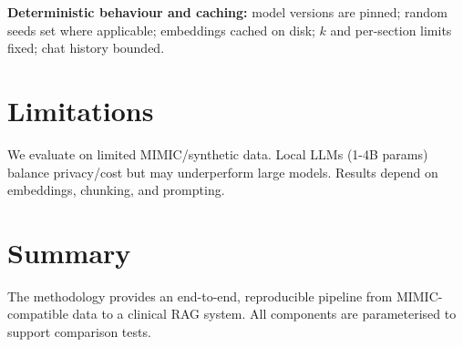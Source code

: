 \noindent \textbf{Deterministic behaviour and caching:} model versions are pinned; random seeds set where applicable; embeddings cached on disk; \(k\) and per-section limits fixed; chat history bounded.

\section{Limitations}
We evaluate on limited MIMIC/synthetic data. Local LLMs (1-4B params) balance privacy/cost but may underperform large models. Results depend on embeddings, chunking, and prompting.

\section{Summary}
The methodology provides an end-to-end, reproducible pipeline from MIMIC-compatible data to a clinical RAG system. All components are parameterised to support comparison tests.
